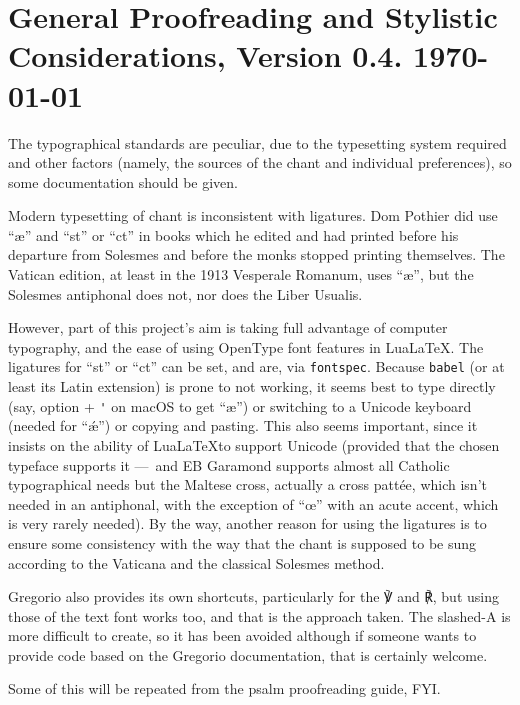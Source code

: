\documentclass[11pt]{article}
\begin{document}
\section{General Proofreading and Stylistic Considerations, Version 0.4. \today}

The typographical standards are peculiar, due to the typesetting system required and other factors (namely, the sources of the chant and individual preferences), so some documentation should be given.

Modern typesetting of chant is inconsistent with ligatures. Dom Pothier did use ``æ'' and ``st'' or ``ct'' in books which he edited and had printed before his departure from Solesmes and before the monks stopped printing themselves. The Vatican edition, at least in the 1913 Vesperale Romanum, uses ``æ'', but the Solesmes antiphonal does not, nor does the Liber Usualis.

However, part of this project's aim is taking full advantage of computer typography, and the ease of using OpenType font features in Lua\LaTeX. The ligatures for ``st'' or ``ct'' can be set, and are, via \verb|fontspec|. Because \verb|babel| (or at least its Latin extension) is prone to not working, it seems best to type directly (say, option + \verb|'| on macOS to get ``æ'') or switching to a Unicode keyboard (needed for ``ǽ'') or copying and pasting. This also seems important, since it insists on the ability of Lua\LaTeX to support Unicode (provided that the chosen typeface supports it — and EB Garamond supports almost all Catholic typographical needs but the Maltese cross, actually a cross pattée, which isn't needed in an antiphonal, with the exception of ``œ'' with an acute accent, which is very rarely needed). By the way, another reason for using the ligatures is to ensure some consistency with the way that the chant is supposed to be sung according to the Vaticana and the classical Solesmes method.

Gregorio also provides its own shortcuts, particularly for the ℣ and ℟, but using those of the text font works too, and that is the approach taken. The slashed-A is more difficult to create, so it has been avoided although if someone wants to provide code based on the Gregorio documentation, that is certainly welcome.

Some of this will be repeated from the psalm proofreading guide, FYI. 
\end{document}
